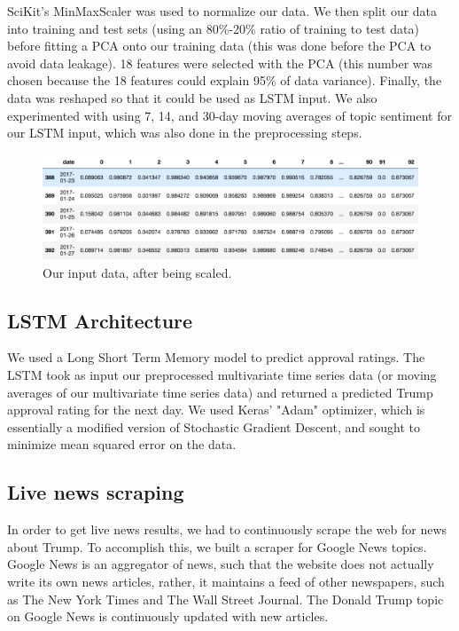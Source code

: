 \documentclass[12pt, letter-paper]{article}
\begin{document}
SciKit's MinMaxScaler was used to normalize our data. We then split our data into training and test sets (using an 80\%-20\% ratio of training to test data) before fitting a PCA onto our training data (this was done before the PCA to avoid data leakage). 18 features were selected with the PCA (this number was chosen because the 18 features could explain 95\% of data variance). Finally, the data was reshaped so that it could be used as LSTM input. We also experimented with using 7, 14, and 30-day moving averages of topic sentiment for our LSTM input, which was also done in the preprocessing steps.

\begin{figure}[H]
\begin{center}
\includegraphics[width=\textwidth]{scaled.png}
\end{center}
\caption{Our input data, after being scaled.}
\end{figure}

\subsection{LSTM Architecture}

We used a Long Short Term Memory model to predict approval ratings. The LSTM took as input our preprocessed multivariate time series data (or moving averages of our multivariate time series data) and returned a predicted Trump approval rating for the next day. We used Keras' "Adam" optimizer, which is essentially a modified version of Stochastic Gradient Descent, and sought to minimize mean squared error on the data.

\subsection{Live news scraping}

In order to get live news results, we had to continuously scrape the web for news about Trump. To accomplish this, we built a scraper for Google News topics. Google News is an aggregator of news, such that the website does not actually write  its own news articles, rather, it maintains a feed of other newspapers, such as The New York Times and The Wall Street Journal. The Donald Trump topic on Google News is continuously updated with new articles.\\
\end{document}
